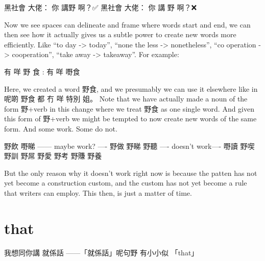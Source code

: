 黑社會 大佬： 你 講野 啊？✅
黑社會 大佬： 你 講 野 啊？❌


Now we see spaces can delineate and frame where words start and end, we can then see how it actually gives us a subtle power to create new words more efficiently.  Like “to day -> today”, “none the less -> nonetheless”, “co operation -> cooperation”, “take away -> takeaway”. For example: 

有 咩 野 食 : 有 咩 嘢食 

Here, we created a word 野食, and we presumably we can use it elsewhere like in 呢啲 野食 都 冇 咩 特別 姐。
Note that we have actually made a noun of the form 野+verb in this change where we treat 野食 as one single word. 
And given this form of 野+verb we might be tempted to now create new words of the same form. And some work. Some do not. 

野飲
嘢睇 
—— maybe work? —-
野做
野睇
野聽
—- doesn’t work—-
嘢讀
野喫
野訓
野屌
野愛
野考
野賺
野養

But the only reason why it doesn’t work right now is because the patten has not yet become a construction custom, and the custom has not yet become a rule that writers can employ. This then, is just a matter of time.  




\section{that}
我想同你講 就係話 ——「就係話」呢句野 有小小似 「that」
